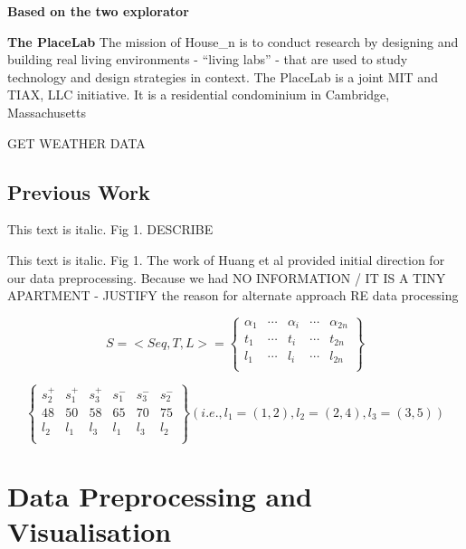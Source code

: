 \documentclass[11pt]{article}
\begin{document}
\textbf{Based on the two explorator}

\textbf{The PlaceLab} The mission of House\_n is to conduct research by
designing and building real living environments - ``living labs'' - that
are used to study technology and design strategies in context. The
PlaceLab is a joint MIT and TIAX, LLC initiative. It is a residential
condominium in Cambridge, Massachusetts

GET WEATHER DATA

    \hypertarget{previous-work}{%
\subsection{Previous Work}\label{previous-work}}

    This text is italic. Fig 1. DESCRIBE

This text is italic. Fig 1. The work of Huang et al provided initial
direction for our data preprocessing. Because we had NO INFORMATION / IT
IS A TINY APARTMENT - JUSTIFY the reason for alternate approach RE data
processing

\begin{equation}
S = 
<Seq,T,L> = 
 \begin{Bmatrix}
  \alpha_{1} & \cdots & \alpha_{i} & \cdots & \alpha_{2n} \\
  t_{1}      & \cdots & t_{i}      & \cdots & t_{2n}      \\
  l_{1}      & \cdots & l_{i}      & \cdots & l_{2n}      \\
 \end{Bmatrix}
\end{equation}

\begin{equation}
 \begin{Bmatrix}
  s_{2}^{+} & s_{1}^{+} & s_{3}^{+} & s_{1}^{-} & s_{3}^{-} & s_{2}^{-} \\
  48        & 50        & 58        & 65        & 70        & 75        \\
  l_{2}     & l_{1}     & l_{3}     & l_{1}     & l_{3}     & l_{2}     \\
 \end{Bmatrix}
 (i.e., l_{1} = (1,2), l_{2} = (2,4), l_{3} = (3,5))
\end{equation}

    \hypertarget{data-preprocessing-and-visualisation}{%
\section{Data Preprocessing and
Visualisation}\label{data-preprocessing-and-visualisation}}
\end{document}

